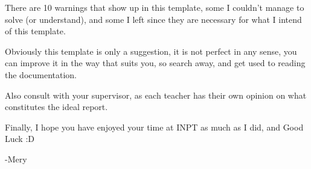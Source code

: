 There are 10 warnings that show up in this template, some I couldn't manage to solve (or understand), and some I left since they are necessary for what I intend of this template.

Obviously this template is only a suggestion, it is not perfect in any sense, you can improve it in the way that suits you, so search away, and get used to reading the documentation.

Also consult with your supervisor, as each teacher has their own opinion on what constitutes the ideal report.

Finally, I hope you have enjoyed your time at INPT as much as I did, and Good Luck :D

-Mery